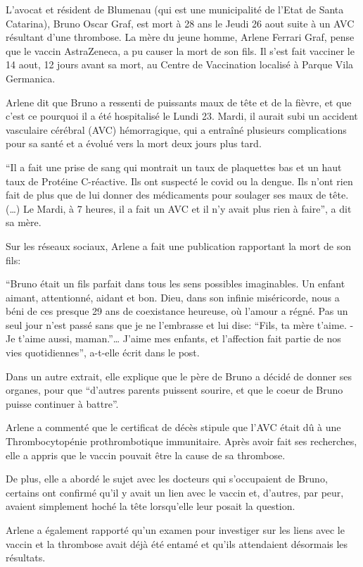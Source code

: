 L'avocat et résident de Blumenau (qui est une municipalité de l'Etat de Santa
Catarina), Bruno Oscar Graf, est mort à 28 ans le Jeudi 26 aout suite à un AVC
résultant d'une thrombose. La mère du jeune homme, Arlene Ferrari Graf, pense
que le vaccin AstraZeneca, a pu causer la mort de son fils. Il s'est fait
vacciner le 14 aout, 12 jours avant sa mort, au Centre de Vaccination localisé à
Parque Vila Germanica.

Arlene dit que Bruno a ressenti de puissants maux de tête et de la fièvre, et
que c'est ce pourquoi il a été hospitalisé le Lundi 23. Mardi, il aurait subi un
accident vasculaire cérébral (AVC) hémorragique, qui a entraîné plusieurs
complications pour sa santé et a évolué vers la mort deux jours plus tard.

“Il a fait une prise de sang qui montrait un taux de plaquettes bas et un haut
taux de Protéine C-réactive. Ils ont suspecté le covid ou la dengue. Ils n'ont
rien fait de plus que de lui donner des médicaments pour soulager ses maux de
tête. (…) Le Mardi, à 7 heures, il a fait un AVC et il n'y avait plus rien à
faire”, a dit sa mère.

Sur les réseaux sociaux, Arlene a fait une publication rapportant la mort de son
fils:

“Bruno était un fils parfait dans tous les sens possibles imaginables. Un
enfant aimant, attentionné, aidant et bon. Dieu, dans son infinie miséricorde,
nous a béni de ces presque 29 ans de coexistance heureuse, où l'amour a
régné. Pas un seul jour n'est passé sans que je ne l'embrasse et lui dise:
“Fils, ta mère t'aime. - Je t'aime aussi, maman.”… J'aime mes enfants, et
l'affection fait partie de nos vies quotidiennes”, a-t-elle écrit dans le post.

Dans un autre extrait, elle explique que le père de Bruno a décidé de donner ses
organes, pour que “d'autres parents puissent sourire, et que le coeur de Bruno
puisse continuer à battre”.

Arlene a commenté que le certificat de décès stipule que l'AVC était dû à une
Thrombocytopénie prothrombotique immunitaire. Après avoir fait ses recherches,
elle a appris que le vaccin pouvait être la cause de sa thrombose.

De plus, elle a abordé le sujet avec les docteurs qui s'occupaient de Bruno,
certains ont confirmé qu'il y avait un lien avec le vaccin et, d'autres, par
peur, avaient simplement hoché la tête lorsqu'elle leur posait la question.

Arlene a également rapporté qu'un examen pour investiger sur les liens avec le
vaccin et la thrombose avait déjà été entamé et qu'ils attendaient désormais les
résultats.

